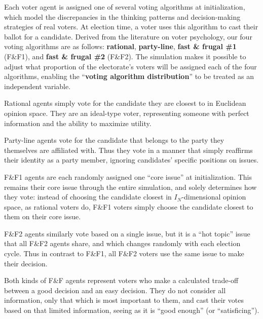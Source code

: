 Each voter agent is assigned one of several voting algorithms at
initialization, which model the discrepancies in the thinking patterns and
decision-making strategies of real voters. At election time, a voter uses this
algorithm to cast their ballot for a candidate. Derived from the literature on
voter psychology\cite[ch.2]{redlawsk_citizens_2020}, our four voting algorithms
are as follows: \textbf{rational}, \textbf{party-line}, \textbf{fast \& frugal
\#1} (F\&F1), and \textbf{fast \& frugal \#2} (F\&F2). The simulation makes it
possible to adjust what proportion of the electorate's voters will be assigned
each of the four algorithms, enabling the ``\textbf{voting algorithm
distribution}'' to be treated as an independent variable.

Rational agents simply vote for the candidate they are closest to in Euclidean
opinion space. They are an ideal-type voter, representing someone with perfect
information and the ability to maximize utility.

Party-line agents vote for the candidate that belongs to the party they
themselves are affiliated with. Thus they vote in a manner that simply
reaffirms their identity as a party member, ignoring candidates' specific
positions on issues.

F\&F1 agents are each randomly assigned one ``core issue'' at initialization.
This remains their core issue through the entire simulation, and solely
determines how they vote: instead of choosing the candidate closest in
$I_N$-dimensional opinion space, as rational voters do, F\&F1 voters simply
choose the candidate closest to them on their core issue.

F\&F2 agents similarly vote based on a single issue, but it is a ``hot topic''
issue that all F\&F2 agents share, and which changes randomly with each
election cycle. Thus in contrast to F\&F1, all F\&F2 voters use the same issue
to make their decision.

Both kinds of F\&F agents represent voters who make a calculated trade-off
between a good decision and an easy decision. They do not consider all
information, only that which is most important to them, and cast their votes
based on that limited information, seeing as it is ``good enough'' (or
``satisficing''\cite{simon_rational_1956}).

